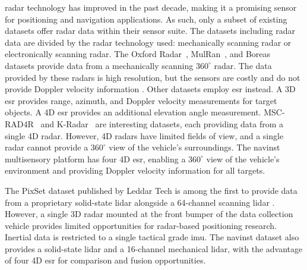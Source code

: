 \ac{radar} technology has improved in the past decade, making it a promising sensor for positioning and navigation applications. As such, only a subset of existing datasets offer \ac{radar} data within their sensor suite. The datasets including \ac{radar} data are divided by the \ac{radar} technology used: mechanically scanning \ac{radar} or electronically scanning \ac{radar}. The Oxford Radar~\cite{barnes_oxford_2020}, MulRan~\cite{kim_mulran_2020}, and Boreas~\cite{burnett_boreas_2023} datasets provide data from a mechanically scanning $360^\circ$ \ac{radar}. The data provided by these \acp{radar} is high resolution, but the sensors are costly and do not provide Doppler velocity information \cite{kung-2021}. Other datasets employ \ac{esr} instead. A 3D \ac{esr} provides range, azimuth, and Doppler velocity measurements for target objects. A 4D \ac{esr} provides an additional elevation angle measurement. MSC-RAD4R~\cite{choi_msc-rad4r_2023} and K-Radar~\cite{paek_k-radar_2023} are interesting datasets, each providing data from a single 4D \ac{radar}. However, 4D \acp{radar} have limited fields of view, and a single \ac{radar} cannot provide a $360^\circ$ view of the vehicle's surroundings. The \ac{navinst} multisensory platform has four 4D \ac{esr}, enabling a $360^\circ$ view of the vehicle's environment and providing Doppler velocity information for all targets.  

The PixSet dataset published by Leddar Tech is among the first to provide data from a proprietary solid-state \ac{lidar} alongside a 64-channel scanning \ac{lidar} \cite{deziel_pixset_2021}. However, a single 3D \ac{radar} mounted at the front bumper of the data collection vehicle provides limited opportunities for \ac{radar}-based positioning research. Inertial data is restricted to a single tactical grade \ac{imu}. The \ac{navinst} dataset also provides a solid-state \ac{lidar} and a 16-channel mechanical \ac{lidar}, with the advantage of four 4D \ac{esr} for comparison and fusion opportunities.